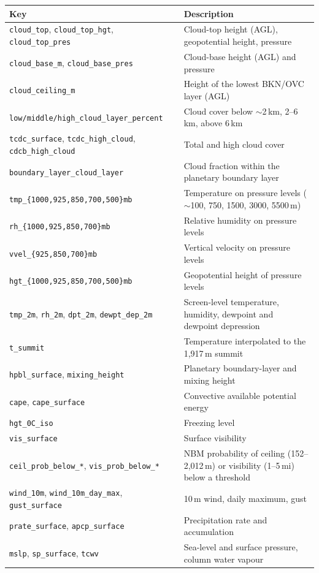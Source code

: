 \documentclass[11pt]{article}
\newcommand{\code}[1]{\texttt{#1}}
\begin{document}
\begin{table}[ht]\centering\small
\begin{tabularx}{\linewidth}{l Y}
\toprule
Key & Description\\
\midrule
\code{cloud\_top}, \code{cloud\_top\_hgt}, \code{cloud\_top\_pres} & Cloud-top height (AGL), geopotential height, pressure\\
\code{cloud\_base\_m}, \code{cloud\_base\_pres} & Cloud-base height (AGL) and pressure\\
\code{cloud\_ceiling\_m} & Height of the lowest BKN/OVC layer (AGL)\\
\code{low/middle/high\_cloud\_layer\_percent} & Cloud cover below $\sim$2\,km, 2--6\,km, above 6\,km\\
\code{tcdc\_surface}, \code{tcdc\_high\_cloud}, \code{cdcb\_high\_cloud} & Total and high cloud cover\\
\code{boundary\_layer\_cloud\_layer} & Cloud fraction within the planetary boundary layer\\
\code{tmp\_\{1000,925,850,700,500\}mb} & Temperature on pressure levels ($\sim$100, 750, 1500, 3000, 5500\,m)\\
\code{rh\_\{1000,925,850,700\}mb} & Relative humidity on pressure levels\\
\code{vvel\_\{925,850,700\}mb} & Vertical velocity on pressure levels\\
\code{hgt\_\{1000,925,850,700,500\}mb} & Geopotential height of pressure levels\\
\code{tmp\_2m}, \code{rh\_2m}, \code{dpt\_2m}, \code{dewpt\_dep\_2m} & Screen-level temperature, humidity, dewpoint and dewpoint depression\\
\code{t\_summit} & Temperature interpolated to the 1{,}917\,m summit\\
\code{hpbl\_surface}, \code{mixing\_height} & Planetary boundary-layer and mixing height\\
\code{cape}, \code{cape\_surface} & Convective available potential energy\\
\code{hgt\_0C\_iso} & Freezing level\\
\code{vis\_surface} & Surface visibility\\
\code{ceil\_prob\_below\_*}, \code{vis\_prob\_below\_*} & NBM probability of ceiling (152--2{,}012\,m) or visibility (1--5\,mi) below a threshold\\
\code{wind\_10m}, \code{wind\_10m\_day\_max}, \code{gust\_surface} & 10\,m wind, daily maximum, gust\\
\code{prate\_surface}, \code{apcp\_surface} & Precipitation rate and accumulation\\
\code{mslp}, \code{sp\_surface}, \code{tcwv} & Sea-level and surface pressure, column water vapour\\
\bottomrule
\end{tabularx}
\end{table}
\end{document}
